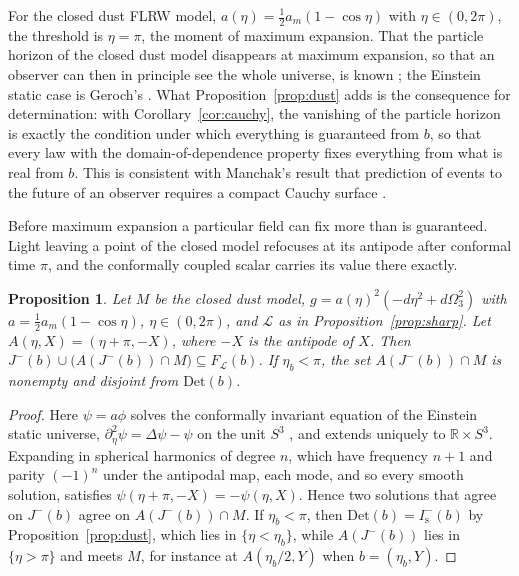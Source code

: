 \documentclass[11pt]{article}
\newtheorem{proposition}[theorem]{Proposition}
\theoremstyle{definition}
\newcommand{\Is}{I^-_{\mathrm s}}
\newcommand{\Det}{\mathrm{Det}}
\begin{document}
For the closed dust FLRW model, $a(\eta)=\tfrac12a_m(1-\cos\eta)$ with
$\eta\in(0,2\pi)$, the threshold is $\eta=\pi$, the moment of maximum
expansion. That the particle horizon of the closed dust model disappears at
maximum expansion, so that an observer can then in principle see the whole
universe, is known \citep{GronJohannesen2011,BolotinTanatarov2013}; the
Einstein static case is Geroch's \citep[Fig.~5]{Geroch1977}. What
Proposition~\ref{prop:dust} adds is the consequence for determination: with
Corollary~\ref{cor:cauchy}, the vanishing of the particle horizon is exactly
the condition under which everything is guaranteed from $b$, so that every
law with the domain-of-dependence property fixes everything from what is real
from $b$. This is consistent with Manchak's result that prediction of events
to the future of an observer requires a compact Cauchy surface
\citep{Manchak2008}.

Before maximum expansion a particular field can fix more than is guaranteed.
Light leaving a point of the closed model refocuses at its antipode after
conformal time $\pi$, and the conformally coupled scalar carries its value
there exactly.

\begin{proposition}\label{prop:echo}
Let $M$ be the closed dust model, $g=a(\eta)^2(-d\eta^2+d\Omega_3^2)$ with
$a=\tfrac12a_m(1-\cos\eta)$, $\eta\in(0,2\pi)$, and $\mathcal L$ as in
Proposition~\ref{prop:sharp}. Let $A(\eta,X)=(\eta+\pi,-X)$, where $-X$ is the
antipode of $X$. Then $J^-(b)\cup\bigl(A(J^-(b))\cap M\bigr)\subseteq
F_{\mathcal L}(b)$. If $\eta_b<\pi$, the set $A(J^-(b))\cap M$ is nonempty and
disjoint from $\Det(b)$.
\end{proposition}

\begin{proof}
Here $\psi=a\phi$ solves the conformally invariant equation of the Einstein
static universe, $\partial_\eta^2\psi=\Delta\psi-\psi$ on the unit $S^3$
\citep[app.~D]{Wald1984}, and extends uniquely to $\mathbb R\times S^3$.
Expanding in spherical harmonics of degree $n$, which have frequency $n+1$
and parity $(-1)^n$ under the antipodal map, each mode, and so every smooth
solution, satisfies $\psi(\eta+\pi,-X)=-\psi(\eta,X)$. Hence two solutions
that agree on $J^-(b)$ agree on $A(J^-(b))\cap M$. If $\eta_b<\pi$, then
$\Det(b)=\Is(b)$ by Proposition~\ref{prop:dust}, which lies in
$\{\eta<\eta_b\}$, while $A(J^-(b))$ lies in $\{\eta>\pi\}$ and meets $M$, for
instance at $A(\eta_b/2,Y)$ when $b=(\eta_b,Y)$.
\end{proof}
\end{document}
